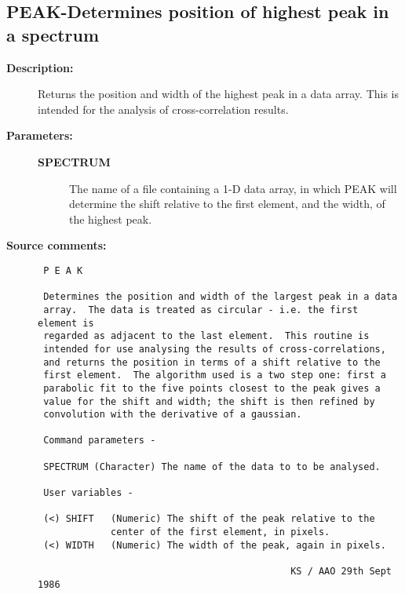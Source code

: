 \subsection{PEAK-\label{PEAK}Determines position of highest peak in a spectrum}
\begin{description}

\item [{\bf Description:}]
 Returns the position and width of the highest peak in a data
 array.  This is intended for the analysis of cross-correlation
 results.

\item [{\bf Parameters:}]
\begin{description}
\item [{\bf SPECTRUM}]
 The name of a file containing a 1-D data array, in
 which PEAK will determine the shift relative to the
 first element, and the width, of the highest peak.
\end{description}

\item [{\bf Source comments:}]
\begin{verbatim}
 P E A K

 Determines the position and width of the largest peak in a data
 array.  The data is treated as circular - i.e. the first element is
 regarded as adjacent to the last element.  This routine is
 intended for use analysing the results of cross-correlations,
 and returns the position in terms of a shift relative to the
 first element.  The algorithm used is a two step one: first a
 parabolic fit to the five points closest to the peak gives a
 value for the shift and width; the shift is then refined by
 convolution with the derivative of a gaussian.

 Command parameters -

 SPECTRUM (Character) The name of the data to to be analysed.

 User variables -

 (<) SHIFT   (Numeric) The shift of the peak relative to the
             center of the first element, in pixels.
 (<) WIDTH   (Numeric) The width of the peak, again in pixels.

                                             KS / AAO 29th Sept 1986
\end{verbatim}
\end{description}
